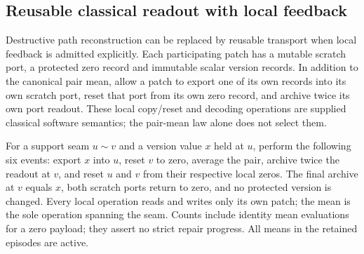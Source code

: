 \subsection{Reusable classical readout with local feedback}
\label{sec:source-feedback-transport}

Destructive path reconstruction can be replaced by reusable transport when
local feedback is admitted explicitly. Each participating patch has a
mutable scratch port, a protected zero record and immutable scalar version
records. In addition to the canonical pair mean, allow a patch to export
one of its own records into its own scratch port, reset that port from its
own zero record, and archive twice its own port readout. These local
copy/reset and decoding operations are supplied classical software semantics;
the pair-mean law alone does not select them.

For a support seam $u\!\sim\!v$ and a version value $x$ held at $u$,
perform the following six events: export $x$ into $u$, reset $v$ to zero,
average the pair, archive twice the readout at $v$, and reset $u$ and $v$
from their respective local zeros. The final archive at $v$ equals $x$,
both scratch ports return to zero, and no protected version is changed.
Every local operation reads and writes only its own patch; the mean is the
sole operation spanning the seam.
Counts include identity mean evaluations for a zero payload; they assert
no strict repair progress. All means in the retained episodes are active.

